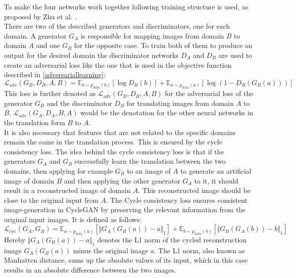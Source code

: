 To make the four networks work together following training structure is used, as proposed by Zhu et al. \cite{Zhu2017}.\\
There are two of the described generators and discriminators, one for each domain.
A generator $G_A$ is responsible for mapping images from domain $B$ to domain $A$ and one $G_B$ for the opposite case.
To train both of them to produce an output for the desired domain the discriminator networks $D_A$ and $D_B$ are used to create an adversarial loss like the one that is used in the objective function described in \ref{adversariallearning}:
\begin{equation}
    \mathcal{L}_{\text{adv}}(G_B, D_B, A, B) = \mathbb{E}_{b\sim p_{\text{data}}(b)}[\log D_B(b)]+\mathbb{E}_{a\sim p_{\text{data}}(a)}[\log(1-D_B(G_B(a)))]
    \label{adv_loss_cycle}
\end{equation}
This loss is further denoted as $\mathcal{L}_{\text{adv}}(G_B,D_B,A,B)$ for the adversarial loss of the generator $G_B$ and the discriminator $D_B$ for translating images from domain $A$ to $B$.
$\mathcal{L}_{\text{adv}}(G_A,D_A,B,A)$ would be the denotation for the other neural networks in the translation form $B$ to $A$.\\
It is also necessary that features that are not related to the specific domains remain the same in the translation process.
This is ensured by the cycle consistency loss.
The idea behind the cycle consistency loss is that if the generators $G_{A}$ and $G_{B}$ successfully learn the translation between the two domains, then applying for example $G_B$ to an image of $A$ to generate an artificial image of domain $B$ and then applying the other generator $G_A$ to it, it should result in a reconstructed image of domain $A$.
This reconstructed image should be close to the original input from $A$.
The Cycle consistency loss ensures consistent image-generation in CycleGAN by preserving the relevant information from the original input images.
It is defined as follows:
\begin{equation}
    \mathcal{L}_{\text{cyc}}(G_A, G_B) = \mathbb{E}_{a\sim p_{\text{data}}(a)}[\Vert G_A(G_B(a)) - a\Vert_1] + \mathbb{E}_{b\sim p_{\text{data}}(b)}[\Vert G_B(G_A(b)) - b\Vert_1]
\end{equation}
Hereby $\Vert G_A(G_B(a)) - a\Vert_1$ denotes the L1 norm of the cycled reconstruction image $G_A(G_B(a))$ minus the original image $a$.
The L1 norm, also known as Manhatten distance, sums up the absolute values of its input, which in this case results in an absolute difference between the two images.
